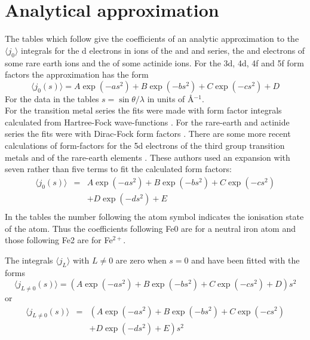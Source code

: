 \documentclass[onecolumn,12pt,a4paper,]{report}
\def\inA{\AA{$^{-1}$}}
\def\p{\par}
\begin{document}
\section{Analytical approximation}
The tables which follow give the coefficients of an analytic approximation 
to the $\langle j_0\rangle$ integrals for the d electrons in ions of the 
and   and  series, the  and 
electrons of some rare earth ions and  the  of some actinide ions. 
For the 3d, 4d, 4f and 5f form factors the approximation has the form
\begin{equation}
\langle j_0(s)\rangle = A \exp(-as^2) + B \exp(-bs^2) + C \exp(-cs^2) + D
\end{equation}
For the data in the tables $s = \sin\theta/\lambda$ in units of \inA.
\\[2ex]
For the transition metal series the fits were made with 
form factor integrals  calculated from Hartree-Fock wave-functions \cite{clementi}. 
For
the rare-earth and actinide series the fits were with
Dirac-Fock form factors \cite{FandD,DandF}. 
There are some more recent calculations of form-factors for the 5d electrons
of the third group transition metals and of the rare-earth elements
\cite{kob:11,kob:12}. These authors used an expansion with seven rather than five terms
to fit the calculated form factors:
\begin{eqnarray}  
\langle j_0(s)\rangle& = &A \exp(-as^2) + B \exp(-bs^2) + C \exp(-cs^2)\nonumber\\
& &+ D \exp(-ds^2) + E\\
\end{eqnarray}
In the tables the number 
following the atom symbol indicates the ionisation state of the atom. 
Thus the coefficients following Fe0 are for a neutral iron atom and 
those following Fe2 are for Fe$^{2+}$.
\p
The integrals $\langle j_L\rangle$ with $L\ne0$ are zero when $s=0$ and have been
fitted with the forms 
\begin{equation}
\langle j_{L\ne 0}(s)\rangle = \left(A\exp(-as^2) + B\exp(-bs^2) + 
C\exp(-cs^2) + D\right)s^2
\end{equation}
or 
\begin{eqnarray}  
\langle j_{L\ne 0}(s)\rangle&= &\left(A\exp(-as^2) + B\exp(-bs^2) + C\exp(-cs^2)\right.\nonumber\\
& &  \left. + D\exp(-ds^2) + E \right)s^2
\end{eqnarray}
\end{document}
